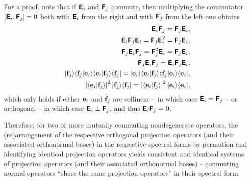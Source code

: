 {\color{OliveGreen}\bproof
For a proof,
note that if $\textsf{\textbf{E}}_{i}$
and
$\textsf{\textbf{F}}_{j}$ commute, then  multiplying the commutator
$\left[
\textsf{\textbf{E}}_{i}
,
\textsf{\textbf{F}}_{j}
\right]=0$
both with
$\textsf{\textbf{E}}_{i}$ from the right
and  with
$\textsf{\textbf{F}}_{j}$ from the left one obtains
\begin{equation}
\begin{split}
\textsf{\textbf{E}}_{i}
\textsf{\textbf{F}}_{j}
=
\textsf{\textbf{F}}_{j}
\textsf{\textbf{E}}_{i}
,\\
\textsf{\textbf{E}}_{i}
\textsf{\textbf{F}}_{j}\textsf{\textbf{E}}_{i}
=
\textsf{\textbf{F}}_{j}
\textsf{\textbf{E}}_{i}^2
=
\textsf{\textbf{F}}_{j}
\textsf{\textbf{E}}_{i}
,\\
\textsf{\textbf{F}}_{j}\textsf{\textbf{E}}_{i}
\textsf{\textbf{F}}_{j}
=
\textsf{\textbf{F}}_{j}^2
\textsf{\textbf{E}}_{i}
=
\textsf{\textbf{F}}_{j}
\textsf{\textbf{E}}_{i}
,\\
\textsf{\textbf{F}}_{j}\textsf{\textbf{E}}_{i}
\textsf{\textbf{F}}_{j}
=
\textsf{\textbf{E}}_{i}
\textsf{\textbf{F}}_{j}\textsf{\textbf{E}}_{i}
,\\
\vert {\bf f}_j \rangle  \langle {\bf f}_j \vert {\bf e}_i \rangle \langle {\bf e}_i \vert {\bf f}_j \rangle \langle {\bf f}_j \vert
=
 \vert {\bf e}_i \rangle \langle {\bf e}_i \vert {\bf f}_j \rangle \langle {\bf f}_j \vert {\bf e}_i \rangle  \langle {\bf e}_i \vert
,\\
\left|\langle {\bf e}_i \vert {\bf f}_j \rangle\right|^2
\vert {\bf f}_j \rangle \langle {\bf f}_j \vert
=
\left|\langle {\bf e}_i \vert {\bf f}_j \rangle\right|^2
 \vert {\bf e}_i \rangle \langle {\bf e}_i \vert
,
\end{split}
\end{equation}
which   only holds if either
${\bf e}_i$
and
${\bf f}_j$
are collinear -- in which case
$\textsf{\textbf{E}}_{i} = \textsf{\textbf{F}}_{j}$ --
or orthogonal
 -- in which case
$\textsf{\textbf{E}}_{i} \perp  \textsf{\textbf{F}}_{j}$,
and thus
$\textsf{\textbf{E}}_{i} \textsf{\textbf{F}}_{j} = 0$.
\eproof
}

Therefore, for two or more mutually commuting nondegenerate operators,
the (re)arrangement of the respective orthogonal projection operators (and their associated orthonormal bases)
in the respective spectral forms by
permution and identifying identical projection operators
yields consistent and identical systems of projection operators (and their associated orthonormal bases) --
commuting normal operators ``share the same projection operators'' in their spectral form.


